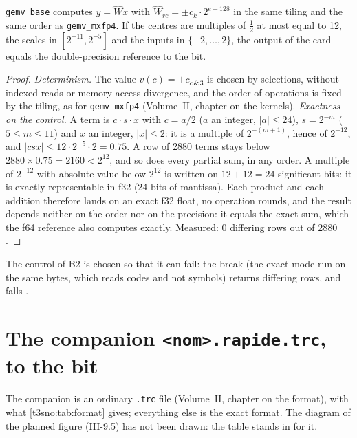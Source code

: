 \begin{proposition}\label{t3sno:prop:b2}
\texttt{gemv\_base} computes $y = \hat W x$ with $\hat W_{rc} = \pm c_{k} \cdot 2^{e - 128}$ in the same tiling and the same order as \texttt{gemv\_mxfp4}. If the centres are multiples of $\frac12$ at most equal to 12, the scales in $[2^{-11}, 2^{-5}]$ and the inputs in $\{-2, \dots, 2\}$, the output of the card equals the double-precision reference to the bit.
\end{proposition}
\begin{proof}
\emph{Determinism.} The value $v(c) = \pm c_{c \,\&\, 3}$ is chosen by selections, without indexed reads or memory-access divergence, and the order of operations is fixed by the tiling, as for \texttt{gemv\_mxfp4} (Volume~II, chapter on the kernels).
\emph{Exactness on the control.} A term is $c \cdot s \cdot x$ with $c = a/2$ ($a$ an integer, $\lvert a \rvert \le 24$), $s = 2^{-m}$ ($5 \le m \le 11$) and $x$ an integer, $\lvert x \rvert \le 2$: it is a multiple of $2^{-(m+1)}$, hence of $2^{-12}$, and $\lvert c s x\rvert \le 12 \cdot 2^{-5} \cdot 2 = 0.75$. A row of \num{2880} terms stays below $\num{2880} \times 0.75 = \num{2160} < 2^{12}$, and so does every partial sum, in any order. A multiple of $2^{-12}$ with absolute value below $2^{12}$ is written on $12 + 12 = 24$ significant bits: it is exactly representable in f32 (24 bits of mantissa). Each product and each addition therefore lands on an exact f32 float, no operation rounds, and the result depends neither on the order nor on the precision: it equals the exact sum, which the f64 reference also computes exactly. Measured: 0 differing rows out of \num{2880} \mes.
\end{proof}

The control of B2 is chosen so that it can fail: the break (the exact mode run on the same bytes, which reads codes and not symbols) returns differing rows, and falls \mes.

\section{The companion \texttt{<nom>.rapide.trc}, to the bit}\label{t3sno:sec:format}

The companion is an ordinary \texttt{.trc} file (Volume~II, chapter on the format), with what \cref{t3sno:tab:format} gives; everything else is the exact format. The diagram of the planned figure (III-9.5) has not been drawn: the table stands in for it.

